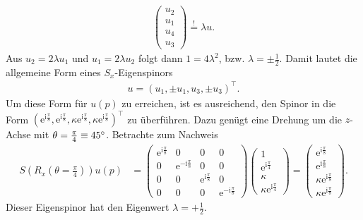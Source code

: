 \documentclass[german, parskip=full]{scrartcl}
\newcommand{\kla}{}
\newcommand{\I}{\text{i}}
\newcommand{\e}{\text{e}}
\begin{document}
\begin{enumerate}
\begin{align*}
\begin{pmatrix}
u_2 \\ u_1 \\ u_4 \\ u_3
\end{pmatrix}\overset{!}{=}\lambda u.
\end{align*}
Aus $u_2=2\lambda u_1$ und $u_1=2\lambda u_2$ folgt dann $1=4\lambda^2$, bzw. $\lambda=\pm\frac{1}{2}$.
Damit lautet die allgemeine Form eines $S_x$-Eigenspinors
\begin{align*}
u=(u_1,\pm u_1,u_3,\pm u_3)^\top .
\end{align*}
Um diese Form für $u(p)$ zu erreichen, ist es ausreichend, den Spinor in die Form $(\e^{\I\frac{\pi}{8}},\e^{\I\frac{\pi}{8}},\kappa\e^{\I\frac{\pi}{8}},\kappa\e^{\I\frac{\pi}{8}})^\top$ zu überführen.
Dazu genügt eine Drehung um die $z$-Achse mit $\theta=\frac{\pi}{4}\equiv 45\degree$.
Betrachte zum Nachweis 
\begin{align*}
S\kla\left( {R_x\kla\left( {\theta=\frac{\pi}{4}} \right)} \right)u(p)&=\begin{pmatrix}
\e^{\I\frac{\pi}{8}}&0&0&0\\
0&\e^{-\I\frac{\pi}{8}}&0&0\\
0&0&\e^{\I\frac{\pi}{8}}&0\\
0&0&0&\e^{-\I\frac{\pi}{8}}
\end{pmatrix}\begin{pmatrix}
1\\ \e^{\I\frac{\pi}{4}} \\ \kappa \\ \kappa \e^{\I\frac{\pi}{4}}
\end{pmatrix}=\begin{pmatrix}
\e^{\I\frac{\pi}{8}} \\ \e^{\I\frac{\pi}{8}} \\ \kappa\e^{\I\frac{\pi}{8}} \\ \kappa\e^{\I\frac{\pi}{8}}
\end{pmatrix}.
\end{align*}
Dieser Eigenspinor hat den Eigenwert $\lambda=+\frac{1}{2}$.
\end{enumerate}
\newpage
\end{document}
